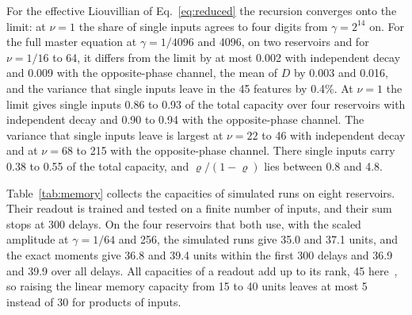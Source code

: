 For the effective Liouvillian of Eq.~\eqref{eq:reduced} the recursion converges onto the limit: at $\nu=1$ the share of single inputs agrees to
four digits from $\gamma=2^{14}$ on. For the full master equation at $\gamma=1/4096$ and 4096, on two reservoirs and
for $\nu=1/16$ to 64, it differs from the limit by at most 0.002 with independent decay and 0.009 with the
opposite-phase channel, the mean of $D$ by 0.003 and 0.016, and the variance that single inputs leave in the 45
features by 0.4\%. At $\nu=1$ the limit gives single inputs 0.86 to 0.93 of the total capacity over four reservoirs
with independent decay and 0.90 to 0.94 with the opposite-phase channel. The variance that single inputs leave is
largest at $\nu=22$ to 46 with independent decay and at $\nu=68$ to 215 with the opposite-phase channel. There single
inputs carry 0.38 to 0.55 of the total capacity, and $\varrho/(1-\varrho)$ lies between 0.8 and 4.8.

Table~\ref{tab:memory} collects the capacities of simulated runs on eight reservoirs. Their readout is trained and
tested on a finite number of inputs, and their sum stops at 300 delays. On the four reservoirs that both use, with the
scaled amplitude at $\gamma=1/64$ and 256, the simulated runs give 35.0 and 37.1 units, and the exact moments give 36.8
and 39.4 units within the first 300 delays and 36.9 and 39.9 over all delays. All capacities of a readout add up to its rank, 45 here~\cite{Dambre2012}, so raising the linear
memory capacity from 15 to 40 units leaves at most 5 instead of 30 for products of inputs.

